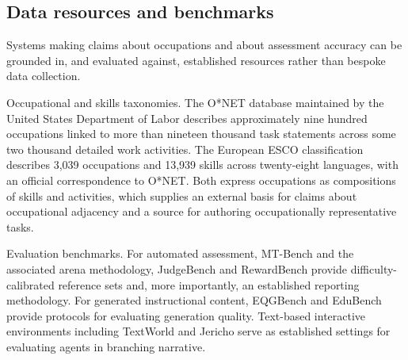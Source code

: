 \subsection{Data resources and benchmarks}

Systems making claims about occupations and about assessment accuracy can be grounded in, and evaluated against, established resources rather than bespoke data collection.

Occupational and skills taxonomies. The O*NET database maintained by the United States Department of Labor describes approximately nine hundred occupations linked to more than nineteen thousand task statements across some two thousand detailed work activities\cite{r62}. The European ESCO classification describes 3,039 occupations and 13,939 skills across twenty-eight languages, with an official correspondence to O*NET\cite{r63}. Both express occupations as compositions of skills and activities, which supplies an external basis for claims about occupational adjacency and a source for authoring occupationally representative tasks.

Evaluation benchmarks. For automated assessment, MT-Bench and the associated arena methodology\cite{r57}, JudgeBench\cite{r60} and RewardBench\cite{r64} provide difficulty-calibrated reference sets and, more importantly, an established reporting methodology. For generated instructional content, EQGBench\cite{r65} and EduBench\cite{r66} provide protocols for evaluating generation quality. Text-based interactive environments including TextWorld\cite{r67} and Jericho\cite{r68} serve as established settings for evaluating agents in branching narrative.


